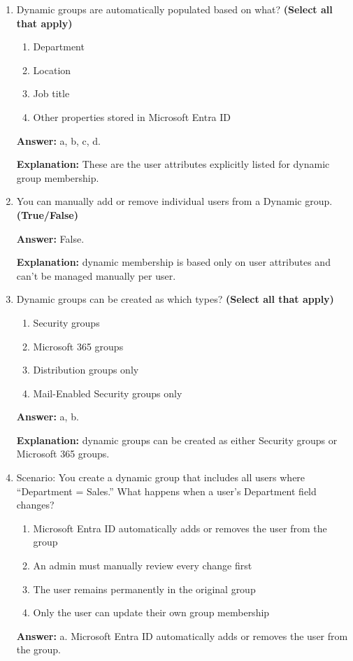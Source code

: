 \documentclass[10pt]{article}
\begin{document}
\begin{enumerate}[leftmargin=*]
\textbf{Explanation:} HR might use a ``Company Announcements'' distribution group to send all-staff updates.

\item Dynamic groups are automatically populated based on what? \textbf{(Select all that apply)}
\begin{enumerate}[label=\alph*., leftmargin=1.5em]
\item Department
\item Location
\item Job title
\item Other properties stored in Microsoft Entra ID
\end{enumerate}
\textbf{Answer:} a, b, c, d.

\textbf{Explanation:} These are the user attributes explicitly listed for dynamic group membership.

\item You can manually add or remove individual users from a Dynamic group. \textbf{(True/False)}

\textbf{Answer:} False.

\textbf{Explanation:} dynamic membership is based only on user attributes and can’t be managed manually per user.

\item Dynamic groups can be created as which types? \textbf{(Select all that apply)}
\begin{enumerate}[label=\alph*., leftmargin=1.5em]
\item Security groups
\item Microsoft 365 groups
\item Distribution groups only
\item Mail-Enabled Security groups only
\end{enumerate}
\textbf{Answer:} a, b.

\textbf{Explanation:} dynamic groups can be created as either Security groups or Microsoft 365 groups.

\item Scenario: You create a dynamic group that includes all users where ``Department = Sales.'' What happens when a user’s Department field changes?
\begin{enumerate}[label=\alph*., leftmargin=1.5em]
\item Microsoft Entra ID automatically adds or removes the user from the group
\item An admin must manually review every change first
\item The user remains permanently in the original group
\item Only the user can update their own group membership
\end{enumerate}
\textbf{Answer:} a. Microsoft Entra ID automatically adds or removes the user from the group.


\end{enumerate}
\end{document}
